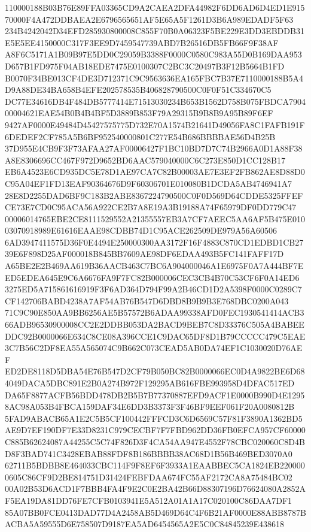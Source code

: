 \documentclass[UTF8,fontset=fandol,zihao=-4,a4paper]{ctexart}
\begin{document}
{{110000188B03B76E89FFA03365CD9A2CAEA2DFA44982F6DD6AD6D4ED1E91570000F4A472DDBAEA2E6796565651AF5E65A5F1261D3B6A989EDADF5F63
234B4242042D34EFD285930800008C855F70B0A06323F5BE229E3DD3EBDDB31E5E5EE4150000C317F3EE9D7459547739ABD7B26516DB5FB66F9F38AF
A8F6C5171A1B09B97E5DD0C29059B3388F0000C0580C983A55D0B169DAA953D657B1FD975F04AB18EDE7475E0100307C2BC3C20497B3F12B5664B1FD
B0070F34BE013CF4DE3D712371C9C9563636EA165FBC7B37E7110000188B5A4D9A88DE34BA658B4EFE202578535B406828790500C0F0F51C334670C5
DC77E34616DB4F484DB5777414E71513030234B653B1562D758B075FBDCA790400004621EAE54B0B4B4BF5D3889B853F79A29315B9B8B9A95B89F6EF
9427AF0000E49484D45427575775D732E70A1574B21641D49056FA8C1FAFB191F6DEDEF2CF785A5B6BF952540000801C277E54B686BBBBAE56D4B25B
37D955E4CB9F3F73AFAA27AF00006427F1BC10BD7D7C74B2966A0D1A88F38A8E8306696CC467F972D9652BD6AAC579040000C6C273E850D1CC128B17
EB6A4523E6CD935DC5E78D1AE97CA7C82B00003AE7E3EF2FB862AE8D88D0C95A04EF1FD13EAF90364676D9F60306701E010080B1DCDA5AB4746941A7
28E8D2255DAD6BF9C183B2ABE8367224790500C0F0D569D64CDDE5325FFEFCE73E7CD0C95ACA56A922CE2B7A8E19A3B19188A74F65979DF0DD779C47
00006014765EBE2CE8111529552A21355557EB3A7CF7AEEC5AA6AF5B475E01003070918989E61616EAAE98CDBB74D1C95ACE262509DE979A56A60506
6AD3947411575D36F0E4494E250000300AA3172F16F4883C870CD1EDBD1CB2739E6F898D25AF000018B845BB7609AE98DF6EDAA493B5FC141FAFF17D
A65BE2E2B469AA619B36AACB463C7BC6A904000046A1E6975F0A7A444BF7EED5EDEA645E9C6A6676FA9F7FC82B000006CEC3CB4B70C53CF6F0A14ED6
3275ED5A715861616919F3F6AD364D794F99A2B46CD1D2A5398F0000C0289C7CF142706BABD4238A7AF54AB76B547D6DBD8B9B9B3E768DBC0200A043
71C9C90E850AA9BB6256AE5B57572B6ADAA99338AFD0FEC1930541414ACB366ADB96530900008CC2E2DDBB053DA2BACD9BEB7C8D33376C505A4BABEE
DDC92B0000066E634C8CE08A396CCE1C9DAC65DF8D1B79CCCCC479C5EAE3C7B56C2DF8EA55A565074C9B662C073CEAD5AB0DA74EF1C1030020D76AEF
ED2DE8118D5DBA54E76B547D2CF79B050BC82B0000066EC0D4A9822BE6D684049DACA5DBC891E2B0A274B972F129295AB616FBE993958D4DFAC517ED
DA65F8877ACFB56BDD478DB2B5B7B77370887EFD9ACF1E0000B990D4E12958AC98A053B4FBCA159DAF34E6DD3B3373F3F46BF9EEF061F20A0080812B
5FAD9ABACB65A1E2C5B5CF100442FFFCD3C6D6569C57F81F3890A1362BD5AE9D7EF190DF7E33D8231C979CECBF7F7FBD962DD36FB0EFCA957CF60000
C885B62624087A44255C5C74F826D3F4CA54AA947E4552F78CBC020060C8D4BD8F3BAD741C3428EBAB88FDF8B186BBBB38AC68D1B56B469BED3070A0
62711B5BDBB8E464033CBC114F9F8EF6F3933A1EAABBEC5CA1824EB2200000605C86CF9D2BE814751D31424FEBFDAA674FC55AF2172CA8A75484BC02
00A02B53D6ACD1F7BBB4FA4F9E2C0E2BA42B66D88307196D76624080A2852AF5EA19DA81DD76FE7CFB0103941E5A512A01A1A17C020100C86DAA7DF1
85A07BB0FCE0413DAD77D4A2458AB5D469D64C4F6B21AF0000E88ABB8787BACBA5A59555D6E758507D9187EA5AD6454565A2E5C0C84845239E438618
}}
\end{document}
